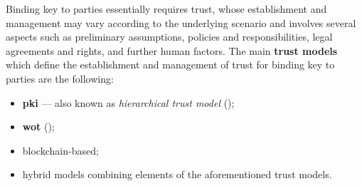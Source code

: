 Binding key to parties essentially requires trust, whose establishment and management may vary according to the underlying scenario and involves several aspects such as preliminary assumptions, policies and responsibilities, legal agreements and rights, and further human factors. The main \textbf{trust models} which define the establishment and management of trust for binding key to parties are the following:

\begin{itemize}
	\item \textbf{\gls{pki}} --- also known as \textit{hierarchical trust model} ();
	\item \textbf{\gls{wot}} ();
	\item blockchain-based; %
	\item hybrid models combining elements of the aforementioned trust models.
\end{itemize}
